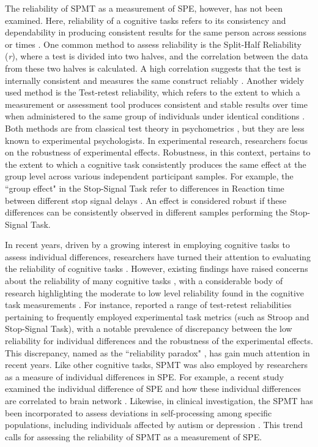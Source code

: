 \documentclass[sn-apa]{sn-jnl}%
\theoremstyle{thmstyleone}%
\theoremstyle{thmstyletwo}%
\theoremstyle{thmstylethree}%
\begin{document}
The reliability of SPMT as a measurement of SPE, however, has not been examined. Here, reliability of a cognitive tasks refers to its consistency and dependability in producing consistent results for the same person across sessions or times \parencite{parsons2019psychological,zorowitz2023}. One common method to assess reliability is the Split-Half Reliability  (\textit{r}), where a test is divided into two halves, and the correlation between the data from these two halves is calculated. A high correlation suggests that the test is internally consistent and measures the same construct reliably \parencite{pronk2022methods}. Another widely used method is the Test-retest reliability, which refers to the extent to which a measurement or assessment tool produces consistent and stable results over time when administered to the same group of individuals under identical conditions \parencite{kline2015handbook}. Both methods are from classical test theory in psychometrics \parencite{borsboom2005measuring}, but they are less known to experimental psychologists. In experimental research, researchers focus on the robustness of experimental effects. Robustness, in this context, pertains to the extent to which a cognitive task consistently produces the same effect at the group level across various independent participant samples. For example, the ``group effect" in the Stop-Signal Task refer to differences in Reaction time between different stop signal delays \parencite{hedge2018reliability}. An effect is considered robust if these differences can be consistently observed in different samples performing the Stop-Signal Task.

In recent years, driven by a growing interest in employing cognitive tasks to assess individual differences, researchers have turned their attention to evaluating the reliability of cognitive tasks \parencite[e.g.,][]{karvelis2023individual,kucina2023calibration}. However, existing findings have raised concerns about the reliability of many cognitive tasks \parencite{hedge2018reliability, rouder2019psychometrics}, with a  considerable body of research highlighting the moderate to low level reliability found in the cognitive task measurements \parencite{clark2022test,green2016use,enkavi2019large}. For instance, \textcite{hedge2018reliability} reported a range of test-retest reliabilities pertaining to frequently employed experimental task metrics (such as Stroop and Stop-Signal Task), with a notable prevalence of discrepancy between the low reliability for individual differences and the robustness of the experimental effects. This discrepancy, named as the ``reliability paradox" \parencite{logie1996group}, has gain much attention in recent years. Like other cognitive tasks, SPMT was also employed by researchers as a measure of individual differences in SPE. For example, a recent study examined the individual difference of SPE and how these individual differences are correlated to brain network \parencite{zhang2023decoding}. Likewise, in clinical investigation, the SPMT has been incorporated to assess deviations in self-processing among specific populations, including individuals affected by autism or depression \parencite{hobbs2023self, liu2022depression}. This trend calls for assessing the reliability of SPMT as a measurement of SPE. 
\end{document}
